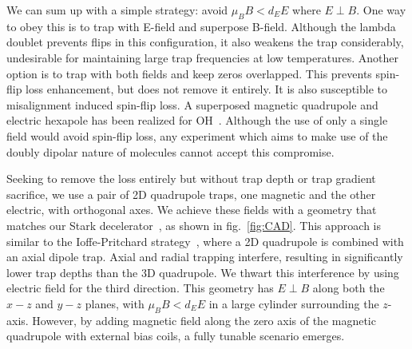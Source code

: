 \documentclass[%
 reprint,
groupedaddress,
 amsmath,amssymb,
 aps,
prl,
]{revtex4-1}
\newcommand{\epb}{$E\!\perp\!B$}
\begin{document}
We can sum up with a simple strategy: avoid $\mu_BB < d_EE$ where \epb. One way to obey this is to trap with E-field and superpose B-field. Although the lambda doublet prevents flips in this configuration, it also weakens the trap considerably, undesirable for maintaining large trap frequencies at low temperatures. Another option is to trap with both fields and keep zeros overlapped. This prevents spin-flip loss enhancement, but does not remove it entirely. It is also susceptible to misalignment induced spin-flip loss. A superposed magnetic quadrupole and electric hexapole has been realized for OH~\cite{Sawyer2007}. Although the use of only a single field would avoid spin-flip loss, any experiment which aims to make use of the doubly dipolar nature of molecules cannot accept this compromise.

Seeking to remove the loss entirely but without trap depth or trap gradient sacrifice, we use a pair of 2D quadrupole traps, one magnetic and the other electric, with orthogonal axes. We achieve these fields with a geometry that matches our Stark decelerator~\cite{Bochinski2003}, as shown in fig.~\ref{fig:CAD}. This approach is similar to the Ioffe-Pritchard strategy~\cite{pritchard1983}, where a 2D quadrupole is combined with an axial dipole trap. Axial and radial trapping interfere, resulting in significantly lower trap depths than the 3D quadrupole. We thwart this interference by using electric field for the third direction. This geometry has \epb{} along both the $x-z$ and $y-z$ planes, with $\mu_BB < d_EE$ in a large cylinder surrounding the $z$-axis. However, by adding magnetic field along the zero axis of the magnetic quadrupole with external bias coils, a fully tunable scenario emerges. %

\end{document}

